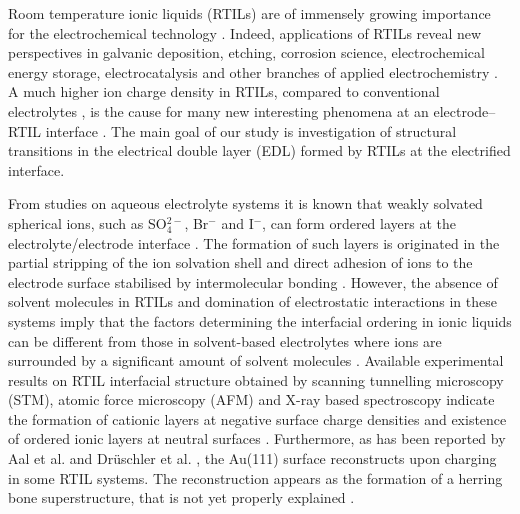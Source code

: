 \documentclass[final,5p,times,twocolumn]{elsarticle}
\begin{document}
Room temperature ionic liquids (RTILs) are of immensely growing importance for the electrochemical technology \cite{Bard2001,Endres2002,Armand2009}. Indeed, applications of RTILs reveal new perspectives in galvanic deposition, etching, corrosion science, electrochemical energy storage, electrocatalysis and other branches of applied electrochemistry \cite{Simon2008,Armand2009,Macfarlane2010,Liu2010}. A much higher ion charge density in RTILs, compared to conventional electrolytes \cite{Galinski2006,Armand2009}, is the cause for many new interesting phenomena at an electrode--RTIL interface \cite{Kornyshev2007,Endres2010}. The main goal of our study is investigation of structural transitions in the electrical double layer (EDL) formed by RTILs at the electrified interface. 

From studies on aqueous electrolyte systems it is known that weakly solvated spherical ions, such as SO$_4^{2-}$, Br$^-$ and I$^-$, can form ordered layers at the electrolyte/electrode interface \cite{Wandlowski2002,Magnussen2002}. The formation of such layers is originated in the partial stripping of the ion solvation shell and direct adhesion of ions to the electrode surface stabilised by intermolecular bonding \cite{Magnussen2002}. However, the absence of solvent molecules in RTILs and domination of electrostatic interactions in these systems imply that the factors determining the interfacial ordering in ionic liquids can be different from those in solvent-based electrolytes where ions are surrounded by a significant amount of solvent molecules \cite{Kornyshev2007,Frolov2011,Georgi2010}. Available experimental results on RTIL interfacial structure  obtained by scanning tunnelling microscopy (STM), atomic force microscopy  (AFM) and X-ray based spectroscopy indicate the formation of cationic layers at negative surface charge densities \cite{Zhou2012,Lauw2012,Tamura2011} and existence of ordered ionic layers at neutral surfaces \cite{Tamam2011,Cremer2011,Foulston2012,Waldmann2011}. Furthermore, as has been reported by Aal et al. \cite{Aal2011} and Dr{\"u}schler et al. \cite{Druschler2012}, the Au(111) surface reconstructs upon charging in some RTIL systems. The reconstruction appears as the formation of a herring bone superstructure, that is not yet properly explained \cite{Aal2011,Druschler2012}.
\end{document}
